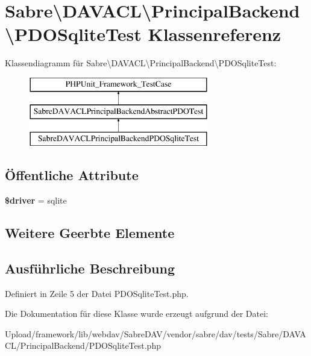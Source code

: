 \hypertarget{class_sabre_1_1_d_a_v_a_c_l_1_1_principal_backend_1_1_p_d_o_sqlite_test}{}\section{Sabre\textbackslash{}D\+A\+V\+A\+CL\textbackslash{}Principal\+Backend\textbackslash{}P\+D\+O\+Sqlite\+Test Klassenreferenz}
\label{class_sabre_1_1_d_a_v_a_c_l_1_1_principal_backend_1_1_p_d_o_sqlite_test}
Klassendiagramm für Sabre\textbackslash{}D\+A\+V\+A\+CL\textbackslash{}Principal\+Backend\textbackslash{}P\+D\+O\+Sqlite\+Test\+:\begin{figure}[H]
\begin{center}
\leavevmode
\includegraphics[height=3.000000cm]{class_sabre_1_1_d_a_v_a_c_l_1_1_principal_backend_1_1_p_d_o_sqlite_test}
\end{center}
\end{figure}
\subsection*{Öffentliche Attribute}
\begin{DoxyCompactItemize}
\item 
\mbox{\label{class_sabre_1_1_d_a_v_a_c_l_1_1_principal_backend_1_1_p_d_o_sqlite_test_a615da24a26e5c8aeefff69ca23964685}} 
{\bfseries \$driver} = \textquotesingle{}sqlite\textquotesingle{}
\end{DoxyCompactItemize}
\subsection*{Weitere Geerbte Elemente}


\subsection{Ausführliche Beschreibung}


Definiert in Zeile 5 der Datei P\+D\+O\+Sqlite\+Test.\+php.



Die Dokumentation für diese Klasse wurde erzeugt aufgrund der Datei\+:\begin{DoxyCompactItemize}
\item 
Upload/framework/lib/webdav/\+Sabre\+D\+A\+V/vendor/sabre/dav/tests/\+Sabre/\+D\+A\+V\+A\+C\+L/\+Principal\+Backend/P\+D\+O\+Sqlite\+Test.\+php\end{DoxyCompactItemize}
